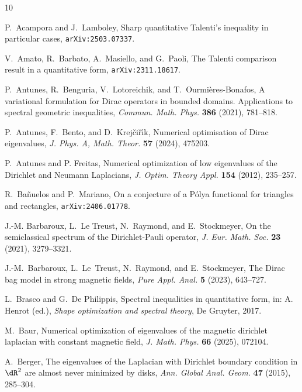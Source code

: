 \documentclass[11pt,a4paper]{amsart}
\numberwithin{figure}{section}
\numberwithin{equation}{section}
\theoremstyle{plain}%
\theoremstyle{remark}
\theoremstyle{plain}
\begin{document}

\begin{thebibliography}{10}

	P.~Acampora and J.~Lamboley,
	Sharp quantitative Talenti's inequality in particular cases, \texttt{arXiv:2503.07337}.

	V.~Amato, R.~Barbato, A.~Masiello, and G.~Paoli,
	The Talenti comparison result in a quantitative form, \texttt{arXiv:2311.18617}.	
		
	P.~Antunes, R.~Benguria, V.~Lotoreichik, and T.~Ourmi{\`e}res-Bonafos,
	A variational formulation for {Dirac} operators in bounded domains.
	{Applications} to spectral geometric inequalities,
	{\em Commun. Math. Phys.} {\bf 386} (2021), 781--818.
	
	P.~Antunes, F.~Bento, and D.~Krej{\v{c}}i{\v{r}}{\'{\i}}k,
	Numerical optimisation of {Dirac} eigenvalues,
	{\em J. Phys. A, Math. Theor.} {\bf 57} (2024),
	475203.
	
	P.~Antunes and P. Freitas, Numerical optimization of low eigenvalues of the Dirichlet and Neumann Laplacians, {\em J. Optim. Theory Appl.} {\bf 154} (2012), 235--257. 
	
	R.~Ba\~nuelos and P.~Mariano, On a conjecture of a P\'olya functional for triangles and rectangles, \texttt{arXiv:2406.01778}.
	
	J.-M. Barbaroux, L.~Le Treust, N.~Raymond, and E.~Stockmeyer,
	On the semiclassical spectrum of the Dirichlet-Pauli operator,
	{\it J. Eur. Math. Soc.} {\bf 23}  (2021), 3279--3321.
	
	J.-M.~Barbaroux, L.~Le~Treust, N.~Raymond, and E.~Stockmeyer,
	The {Dirac} bag model in strong magnetic fields,
	{\em Pure Appl. Anal.}  {\bf 5} (2023), 643--727.
	
	L.~Brasco and G.~De Philippis, Spectral inequalities in quantitative form, in: A. Henrot (ed.), {\it Shape optimization and spectral theory}, De Gruyter, 2017.
	
	M.~Baur,
	\newblock Numerical optimization of eigenvalues of the magnetic dirichlet
	laplacian with constant magnetic field, {\it J. Math. Phys.} {\bf 66} (2025), 072104.
	
	A.~Berger, The eigenvalues of the Laplacian with Dirichlet boundary condition in $\dR^2$
	are almost never minimized by disks,
	{\it Ann. Global Anal. Geom.} {\bf 47} (2015),  285--304.
	

\end{thebibliography}
\end{document}
